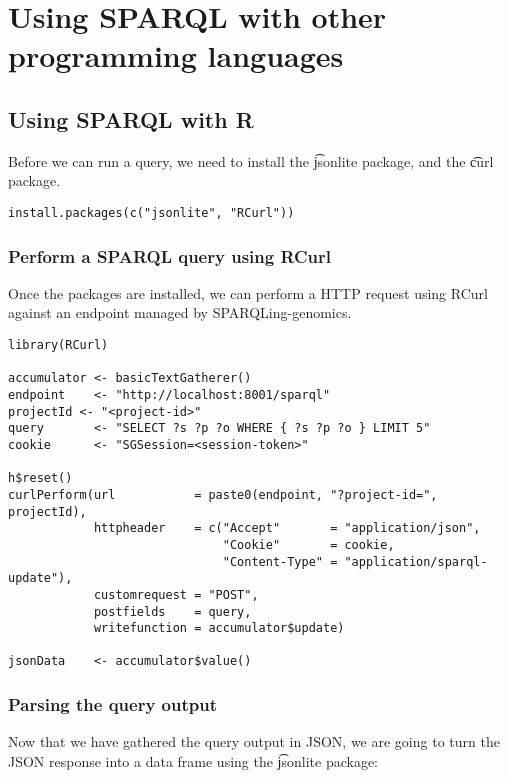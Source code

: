 \chapter{Using SPARQL with other programming languages}
\label{chap:programming}

\section{Using SPARQL with R}

  Before we can run a query, we need to install the \t{jsonlite} package,
  and the \t{curl} package.

\begin{siderules}
\begin{verbatim}
install.packages(c("jsonlite", "RCurl"))
\end{verbatim}
\end{siderules}

\subsection{Perform a SPARQL query using RCurl}

  Once the packages are installed, we can perform a HTTP request using RCurl
  against an endpoint managed by SPARQLing-genomics.

\begin{siderules}
\begin{verbatim}
library(RCurl)

accumulator <- basicTextGatherer()
endpoint    <- "http://localhost:8001/sparql"
projectId <- "<project-id>"
query       <- "SELECT ?s ?p ?o WHERE { ?s ?p ?o } LIMIT 5"
cookie      <- "SGSession=<session-token>"

h$reset()
curlPerform(url           = paste0(endpoint, "?project-id=", projectId),
            httpheader    = c("Accept"       = "application/json",
                              "Cookie"       = cookie,
                              "Content-Type" = "application/sparql-update"),
            customrequest = "POST",
            postfields    = query,
            writefunction = accumulator$update)

jsonData    <- accumulator$value()
\end{verbatim}
\end{siderules}

\subsection{Parsing the query output}
  Now that we have gathered the query output in JSON, we are going to turn
  the JSON response into a data frame using the \t{jsonlite} package:

